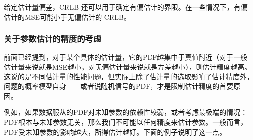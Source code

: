         给定估计量偏差，CRLB 还可以用于确定有偏估计的界限。在一些情况下，有偏估计的MSE可能小于无偏估计的 CRLB。


        \subsubsection{关于参数估计的精度的考虑}
        前面已经提到，对于某个具体的估计量，它的PDF越集中于真值附近（对于一般估计量来说就是MSE越小，对无偏估计量来说就是方差越小），则估计精度越高。这说的是不同估计量的性能问题，但实际上除了估计量的选取影响了估计精度外，问题的概率模型自身——或者说随机信号的PDF，才是限制估计精度的首要原因。

        例如，如果数据服从的PDF对未知参数的依赖性较弱，或者考虑最极端的情况：PDF根本与未知参数无关，那么我们不可能以任何精度来估计参数。一般而言，PDF受未知参数的影响越大，所得估计越好。下面的例子说明了这一点。

